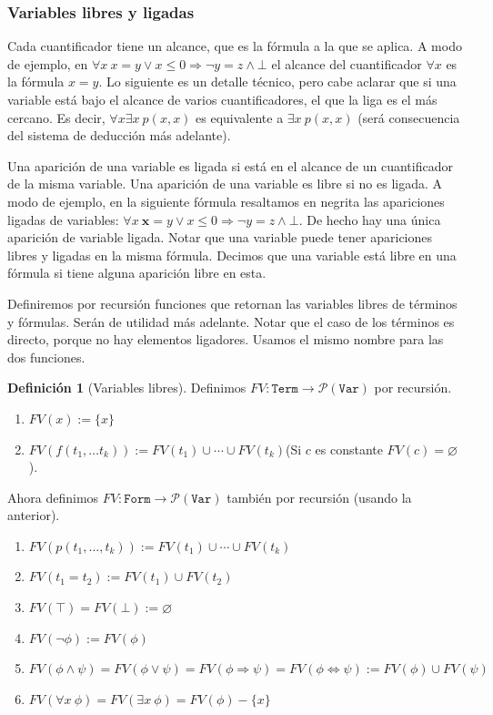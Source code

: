 \documentclass[a4paper, 12pt]{report}
\newcommand{\Ra}{\Rightarrow}
\newcommand{\Lra}{\Leftrightarrow}
\theoremstyle{definition}
\newtheorem{definicion}[teorema]{Definición}
\begin{document}
\subsubsection{Variables libres y ligadas}

Cada cuantificador tiene un alcance, que es la fórmula a la que se aplica. A modo de ejemplo, en $\forall x ~x=y\vee x\leq 0\Ra \lnot y=z\wedge \bot$ el alcance del cuantificador $\forall x$ es la fórmula  $x=y$. Lo siguiente es un detalle técnico, pero cabe aclarar que si una variable está bajo el alcance de varios cuantificadores, el que la liga es el más cercano. Es decir, $\forall x \exists x~p(x,x)$ es equivalente a $\exists x~p(x,x)$ (será consecuencia del sistema de deducción más adelante).

Una aparición de una variable es ligada si está en el alcance de un cuantificador de la misma variable. Una aparición de una variable es libre si no es ligada. A modo de ejemplo, en la siguiente fórmula resaltamos en negrita las apariciones ligadas de variables: $\forall x ~\mathbf{x}=y\vee x\leq 0\Ra \lnot y=z\wedge \bot$. De hecho hay una única aparición de variable ligada. Notar que una variable puede tener apariciones libres y ligadas en la misma fórmula. Decimos que una variable está libre en una fórmula si tiene alguna aparición libre en esta.

Definiremos por recursión funciones que retornan las variables libres de términos y fórmulas. Serán de utilidad más adelante. Notar que el caso de los términos es directo, porque no hay elementos ligadores. Usamos el mismo nombre para las dos funciones.
\begin{definicion}[Variables libres]
	Definimos $FV:\mathtt{Term}\to\mathcal{P}(\mathtt{Var})$ por recursión.
	\begin{enumerate}
		\item $FV(x) := \{x\}$
		\item $FV(f(t_1,\dots t_k)) := FV(t_1)\cup\cdots\cup FV(t_k)$\quad (Si $c$ es constante $FV(c)=\varnothing$).
	\end{enumerate}
	Ahora definimos $FV:\mathtt{Form}\to\mathcal{P}(\mathtt{Var})$ también por recursión (usando la anterior).
	\begin{enumerate}
		\item  $FV(p(t_1,\dots,t_k)) := FV(t_1)\cup\cdots\cup FV(t_k)$
		\item $FV(t_1=t_2) := FV(t_1)\cup FV(t_2)$
		\item $FV(\top)=FV(\bot):=\varnothing$
		\item $FV(\lnot\phi) := FV(\phi)$
		\item  $FV(\phi\wedge\psi)=FV(\phi\vee\psi)=FV(\phi\Ra\psi)=FV(\phi\Lra\psi) := FV(\phi)\cup FV(\psi)$
		\item $FV(\forall x~\phi) = FV(\exists x~\phi) = FV(\phi) - \{x\}$
	\end{enumerate}
\end{definicion}
\end{document}
